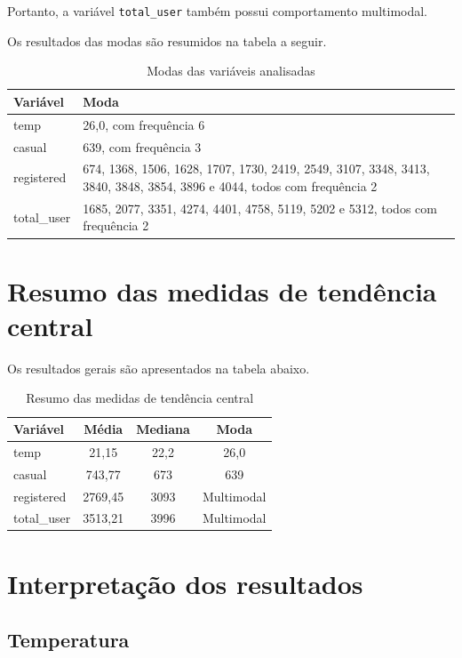 \documentclass[12pt,a4paper]{article}
\begin{document}
Portanto, a variável \texttt{total\_user} também possui comportamento
multimodal.

Os resultados das modas são resumidos na tabela a seguir.

\begin{table}[H]
\centering
\caption{Modas das variáveis analisadas}
\begin{tabular}{p{3cm}p{10cm}}
\toprule
\textbf{Variável} & \textbf{Moda} \\
\midrule
temp & 26,0, com frequência 6 \\
casual & 639, com frequência 3 \\
registered & 674, 1368, 1506, 1628, 1707, 1730, 2419, 2549,
3107, 3348, 3413, 3840, 3848, 3854, 3896 e 4044, todos com frequência 2 \\
total\_user & 1685, 2077, 3351, 4274, 4401, 4758, 5119, 5202 e 5312,
todos com frequência 2 \\
\bottomrule
\end{tabular}
\end{table}

\section{Resumo das medidas de tendência central}

Os resultados gerais são apresentados na tabela abaixo.

\begin{table}[H]
\centering
\caption{Resumo das medidas de tendência central}
\begin{tabular}{lccc}
\toprule
\textbf{Variável} &
\textbf{Média} &
\textbf{Mediana} &
\textbf{Moda} \\
\midrule
temp & 21,15 & 22,2 & 26,0 \\
casual & 743,77 & 673 & 639 \\
registered & 2769,45 & 3093 & Multimodal \\
total\_user & 3513,21 & 3996 & Multimodal \\
\bottomrule
\end{tabular}
\end{table}

\section{Interpretação dos resultados}

\subsection{Temperatura}
\end{document}

